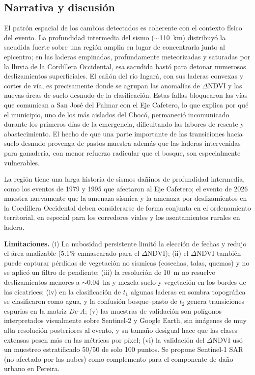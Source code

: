 \documentclass[12pt]{article}
\begin{document}
\subsection{Narrativa y discusión}
El patrón espacial de los cambios detectados es coherente con el contexto físico del evento. La profundidad intermedia del sismo ($\sim$110~km) distribuyó la sacudida fuerte sobre una región amplia en lugar de concentrarla junto al epicentro; en las laderas empinadas, profundamente meteorizadas y saturadas por la lluvia de la Cordillera Occidental, esa sacudida bastó para detonar numerosos deslizamientos superficiales. El cañón del río Ingará, con sus laderas convexas y cortes de vía, es precisamente donde se agrupan las anomalías de $\Delta$NDVI y las nuevas áreas de suelo desnudo de la clasificación. Estas fallas bloquearon las vías que comunican a San José del Palmar con el Eje Cafetero, lo que explica por qué el municipio, uno de los más aislados del Chocó, permaneció incomunicado durante los primeros días de la emergencia, dificultando las labores de rescate y abastecimiento. El hecho de que una parte importante de las transiciones hacia suelo desnudo provenga de pastos muestra además que las laderas intervenidas para ganadería, con menor refuerzo radicular que el bosque, son especialmente vulnerables.

La región tiene una larga historia de sismos dañinos de profundidad intermedia, como los eventos de 1979 y 1995 que afectaron al Eje Cafetero; el evento de 2026 muestra nuevamente que la amenaza sísmica y la amenaza por deslizamientos en la Cordillera Occidental deben considerarse de forma conjunta en el ordenamiento territorial, en especial para los corredores viales y los asentamientos rurales en ladera.

\textbf{Limitaciones.} (i) La nubosidad persistente limitó la elección de fechas y redujo el área analizable (5.1\% enmascarado para el $\Delta$NDVI); (ii) el $\Delta$NDVI también puede capturar pérdidas de vegetación no sísmicas (cosechas, talas, quemas) y no se aplicó un filtro de pendiente; (iii) la resolución de 10~m no resuelve deslizamientos menores a $\sim$0.04~ha y mezcla suelo y vegetación en los bordes de las cicatrices; (iv) en la clasificación de $t_1$ algunas laderas en sombra topográfica se clasificaron como agua, y la confusión bosque--pasto de $t_2$ genera transiciones espurias en la matriz \emph{De-A}; (v) las muestras de validación son polígonos interpretados visualmente sobre Sentinel-2 y Google Earth, sin imágenes de muy alta resolución posteriores al evento, y su tamaño desigual hace que las clases extensas pesen más en las métricas por píxel; (vi) la validación del $\Delta$NDVI usó un muestreo estratificado 50/50 de solo 100 puntos. Se propone Sentinel-1 SAR (no afectado por las nubes) como complemento para el componente de daño urbano en Pereira.
\end{document}
